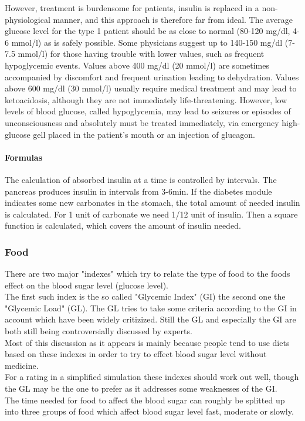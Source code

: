 \documentclass[pdflatex,a4paper,11pt,english]{scrreprt}
\begin{document}
However, treatment is burdensome for patients, insulin is replaced in a
non-physiological manner, and this approach is therefore far from ideal. The
average glucose level for the type 1 patient should be as close to normal
(80-120 mg/dl, 4-6 mmol/l) as is safely possible. Some physicians suggest up to
140-150 mg/dl (7-7.5 mmol/l) for those having trouble with lower values, such
as frequent hypoglycemic events. Values above 400 mg/dl (20 mmol/l) are
sometimes accompanied by discomfort and frequent urination leading to
dehydration. Values above 600 mg/dl (30 mmol/l) usually require medical
treatment and may lead to ketoacidosis, although they are not immediately
life-threatening. However, low levels of blood glucose, called hypoglycemia,
may lead to seizures or episodes of unconsciousness and absolutely must be
treated immediately, via emergency high-glucose gell placed in the patient's
mouth or an injection of glucagon.

\paragraph{Formulas} 
The calculation of absorbed insulin at a time is controlled by intervals. The pancreas produces insulin in intervals from 3-6min.
If the diabetes module indicates some new carbonates in the stomach, the total amount of needed insulin is calculated.
For 1 unit of carbonate we need 1/12 unit of insulin. Then a square function is calculated, which covers the amount of insulin needed.

\newpage
\subsubsection{Food}
There are two major "indexes" which try to relate the type of food to the foods effect on the blood sugar level (glucose level). \\
The first such index is the so called "Glycemic Index" (GI) the second one the "Glycemic Load" (GL).
The GL tries to take some criteria according to the GI in account which have been widely critizized. Still the GL and especially the GI are both still being controversially discussed by experts. \\
Most of this discussion as it appears is mainly because people tend to use
diets based on these indexes in order to try to effect blood sugar level
without medicine. \\
For a rating in a simplified simulation these indexes should
work out well, though the GL may be the one to prefer as it addresses some
weaknesses of the GI. \\
The time needed for food to affect the blood sugar can roughly be splitted up
into three groups of food which affect blood sugar level fast, moderate or
slowly.
\end{document}
